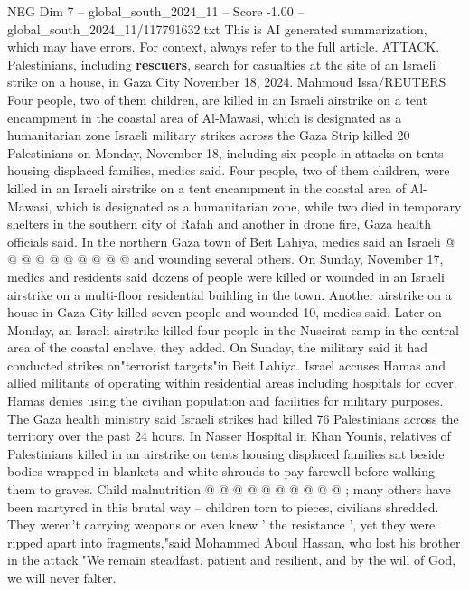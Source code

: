 \begin{textsample}{NEG Dim 7 – global\_south\_2024\_11 – Score -1.00 – global\_south\_2024\_11/117791632.txt}  \label{ex:f7_neg_312}
This is AI generated summarization, which may have errors.
For context, always refer to the full article.
ATTACK.
Palestinians, including \textbf{rescuers}, search for casualties at the site of an Israeli strike on a house, in Gaza City November 18, 2024.
Mahmoud Issa/REUTERS Four people, two of them children, are killed in an Israeli airstrike on a tent encampment in the coastal area of Al-Mawasi, which is designated as a humanitarian zone Israeli military strikes across the Gaza Strip killed 20 Palestinians on Monday, November 18, including six people in attacks on tents housing displaced families, medics said.
Four people, two of them children, were killed in an Israeli airstrike on a tent encampment in the coastal area of Al-Mawasi, which is designated as a humanitarian zone, while two died in temporary shelters in the southern city of Rafah and another in drone fire, Gaza health officials said.
In the northern Gaza town of Beit Lahiya, medics said an Israeli @ @ @ @ @ @ @ @ @ @ and wounding several others.
On Sunday, November 17, medics and residents said dozens of people were killed or wounded in an Israeli airstrike on a multi-floor residential building in the town.
Another airstrike on a house in Gaza City killed seven people and wounded 10, medics said.
Later on Monday, an Israeli airstrike killed four people in the Nuseirat camp in the central area of the coastal enclave, they added.
On Sunday, the military said it had conducted strikes on"terrorist targets"in Beit Lahiya.
Israel accuses Hamas and allied militants of operating within residential areas including hospitals for cover.
Hamas denies using the civilian population and facilities for military purposes.
The Gaza health ministry said Israeli strikes had killed 76 Palestinians across the territory over the past 24 hours.
In Nasser Hospital in Khan Younis, relatives of Palestinians killed in an airstrike on tents housing displaced families sat beside bodies wrapped in blankets and white shrouds to pay farewell before walking them to graves.
Child malnutrition @ @ @ @ @ @ @ @ @ @ ; many others have been martyred in this brutal way -- children torn to pieces, civilians shredded.
They weren't carrying weapons or even knew ' the resistance ', yet they were ripped apart into fragments,"said Mohammed Aboul Hassan, who lost his brother in the attack."We remain steadfast, patient and resilient, and by the will of God, we will never falter.

\end{textsample}
